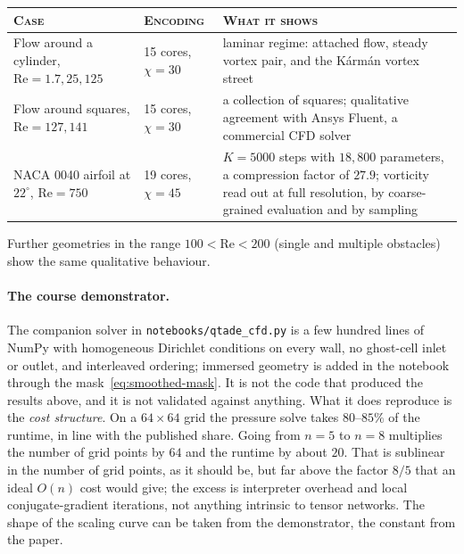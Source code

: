 \begin{center}
  \begin{tabular}{@{}p{}p{}p{}@{}}
    \toprule
    \textsc{Case} & \textsc{Encoding} & \textsc{What it shows} \\
    \midrule
    Flow around a cylinder,
    $\mathrm{Re} = 1.7, 25, 125$
      & 15 cores, $\chi = 30$
      & laminar regime: attached flow, steady vortex pair, and the K\'arm\'an
        vortex street \\
    Flow around squares,
    $\mathrm{Re} = 127, 141$
      & 15 cores, $\chi = 30$
      & a collection of squares; qualitative agreement with Ansys Fluent, a
        commercial CFD solver \\
    NACA 0040 airfoil at $22^\circ$,
    $\mathrm{Re} = 750$
      & 19 cores, $\chi = 45$
      & $K = 5000$ steps with $18{,}800$ parameters, a compression factor of
        $27.9$; vorticity read out at full resolution, by coarse-grained
        evaluation and by sampling \\
    \bottomrule
  \end{tabular}
\end{center}

\noindent
Further geometries in the range $100 < \mathrm{Re} < 200$ (single and multiple
obstacles) show the same qualitative behaviour.

\paragraph{The course demonstrator.}
The companion solver in \texttt{notebooks/qtade\_cfd.py} is a few hundred lines
of NumPy with homogeneous Dirichlet conditions on every wall, no ghost-cell inlet
or outlet, and interleaved ordering; immersed geometry is added in the notebook
through the mask~\eqref{eq:smoothed-mask}. It is not the code that produced the
results above, and it is not validated against anything. What it does reproduce
is the \emph{cost structure}. On a $64\times64$ grid the pressure solve takes
$80$--$85\%$ of the runtime, in line with the published share. Going from $n=5$
to $n=8$ multiplies the number of grid points by $64$ and the runtime by about
$20$. That is sublinear in the number of grid points, as it should be, but far
above the factor $8/5$ that an ideal $O(n)$ cost would give; the excess is
interpreter overhead and local conjugate-gradient iterations, not anything
intrinsic to tensor networks. The shape of the scaling curve can be taken from
the demonstrator, the constant from the paper.

